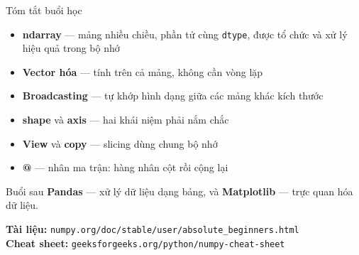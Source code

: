 \documentclass[11pt]{beamer}
\begin{document}
\begin{frame}{Tóm tắt buổi học}
\begin{itemize}
  \item \textbf{ndarray} --- mảng nhiều chiều, phần tử cùng \texttt{dtype}, được tổ chức và xử lý hiệu quả trong bộ nhớ
  \item \textbf{Vector hóa} --- tính trên cả mảng, không cần vòng lặp
  \item \textbf{Broadcasting} --- tự khớp hình dạng giữa các mảng khác kích thước
  \item \textbf{shape} và \textbf{axis} --- hai khái niệm phải nắm chắc
  \item \textbf{View} và \textbf{copy} --- slicing dùng chung bộ nhớ
  \item \textbf{@} --- nhân ma trận: hàng nhân cột rồi cộng lại
\end{itemize}
\begin{block}{Buổi sau}
\textbf{Pandas} --- xử lý dữ liệu dạng bảng, và \textbf{Matplotlib} --- trực quan hóa dữ liệu.
\end{block}
\begin{center}
\small\textbf{Tài liệu:} \texttt{numpy.org/doc/stable/user/absolute\_beginners.html} \\
\small\textbf{Cheat sheet:} \texttt{geeksforgeeks.org/python/numpy-cheat-sheet}
\end{center}
\end{frame}
\end{document}
